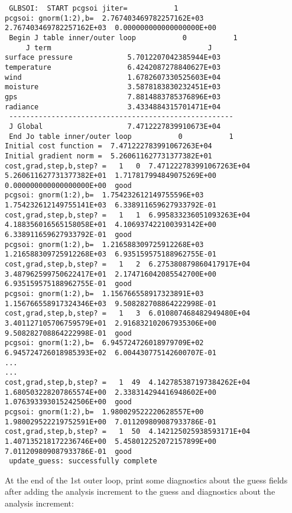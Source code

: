 \begin{tiny}
\begin{verbatim}
 GLBSOI:  START pcgsoi jiter=           1
pcgsoi: gnorm(1:2),b=  2.767403469782257162E+03  2.767403469782257162E+03  0.000000000000000000E+00
 Begin J table inner/outer loop           0           1
     J term                                     J
surface pressure             5.7012207042385944E+03
temperature                  6.4242087278840627E+03
wind                         1.6782607330525603E+04
moisture                     3.5878183830232451E+03
gps                          7.8814883785376896E+03
radiance                     3.4334884315701471E+04
 -----------------------------------------------------
 J Global                    7.4712227839910673E+04
 End Jo table inner/outer loop           0           1
Initial cost function =  7.471222783991067263E+04
Initial gradient norm =  5.260611627731377382E+01
cost,grad,step,b,step? =   1   0  7.471222783991067263E+04  5.260611627731377382E+01  1.717817994849075269E+00  0.000000000000000000E+00  good
pcgsoi: gnorm(1:2),b=  1.754232612149755596E+03  1.754232612149755141E+03  6.338911659627933792E-01
cost,grad,step,b,step? =   1   1  6.995833236051093263E+04  4.188356016565158058E+01  4.106937422100393142E+00  6.338911659627933792E-01  good
pcgsoi: gnorm(1:2),b=  1.216588309725912268E+03  1.216588309725912268E+03  6.935159575188962755E-01
cost,grad,step,b,step? =   1   2  6.275380879860417917E+04  3.487962599750622417E+01  2.174716042085542700E+00  6.935159575188962755E-01  good
pcgsoi: gnorm(1:2),b=  1.156766558917323891E+03  1.156766558917324346E+03  9.508282708864222998E-01
cost,grad,step,b,step? =   1   3  6.010807468482949480E+04  3.401127105706759579E+01  2.916832102067935306E+00  9.508282708864222998E-01  good
pcgsoi: gnorm(1:2),b=  6.945724726018979709E+02  6.945724726018985393E+02  6.004430775142600707E-01
...
...
cost,grad,step,b,step? =   1  49  4.142785387197384262E+04  1.680503228207865574E+00  2.338314294416948602E+00  1.076393393015242506E+00  good
pcgsoi: gnorm(1:2),b=  1.980029522220628557E+00  1.980029522219752591E+00  7.011209809087933786E-01
cost,grad,step,b,step? =   1  50  4.142125025938593171E+04  1.407135218172236746E+00  5.458012252072157899E+00  7.011209809087933786E-01  good
 update_guess: successfully complete
\end{verbatim}
\end{tiny}
At the end of the 1st outer loop, print some diagnostics about the guess fields after adding the analysis increment to the guess and diagnostics about the analysis increment: 
